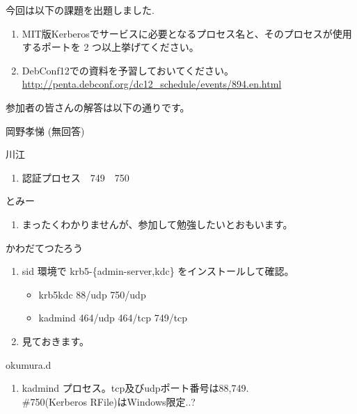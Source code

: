 \documentclass[mingoth,a4paper]{jsarticle}
\begin{document}

今回は以下の課題を出題しました.
\begin{screen}
  \begin{enumerate}
  \item MIT版Kerberosでサービスに必要となるプロセス名と、そのプロセスが使用するポートを 2 つ以上挙げてください。

  \item DebConf12での資料を予習しておいてください。\\
   \url{http://penta.debconf.org/dc12_schedule/events/894.en.html}

  \end{enumerate}
\end{screen}

参加者の皆さんの解答は以下の通りです。

\begin{prework}{ 岡野孝悌 }
  (無回答)
\end{prework}

\begin{prework}{ 川江 }
  \begin{enumerate}
  \item 認証プロセス　749　750
  \end{enumerate}
\end{prework}

\begin{prework}{ とみー }
  \begin{enumerate}
  \item まったくわかりませんが、参加して勉強したいとおもいます。
  \end{enumerate}
\end{prework}

\begin{prework}{ かわだてつたろう }
  \begin{enumerate}
  \item sid 環境で krb5-\{admin-server,kdc\} をインストールして確認。
    \begin{itemize}
    \item krb5kdc 88/udp 750/udp
    \item kadmind 464/udp 464/tcp 749/tcp
    \end{itemize}
  \item 見ておきます。
  \end{enumerate}
\end{prework}

\begin{prework}{ okumura.d }
  \begin{enumerate}
  \item kadmind プロセス。tcp及びudpポート番号は88,749.\\
    \#750(Kerberos RFile)はWindows限定..?
  \end{enumerate}
\end{prework}
\end{document}
